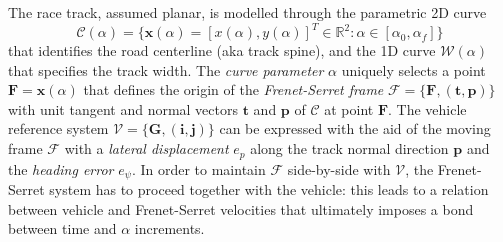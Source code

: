 \documentclass[conference]{IEEEtran} %
\renewcommand{\vec}[1]{\boldsymbol{#1}}
\DeclarePairedDelimiter{\norm}{\lVert}{\rVert}
\begin{document}
The race track, assumed planar, is modelled through the parametric 2D curve
\begin{equation}
\mathcal C(\alpha) = \{ \vec x (\alpha) = [x(\alpha), y(\alpha)]^T \in \mathbb{R}^2 : \alpha \in [\alpha_0, \alpha_f] \}
\end{equation}
%
that identifies the road centerline (aka track spine), and the 1D curve $\mathcal W(\alpha)$ that specifies the track width.
The \emph{curve parameter} $\alpha$ uniquely selects a point $\vec F = \vec x(\alpha)$ that defines the origin of the \emph{Frenet-Serret frame} $\mathcal F = \{ \vec F, (\vec t, \vec p) \}$ with unit tangent and normal vectors $\vec t$ and $\vec p$ of $\mathcal C$ at point $\vec F$.
%
The vehicle reference system $\mathcal V = \{ \vec G, (\vec i, \vec j) \}$ can be expressed with the aid of the moving frame $\mathcal F$ with a \emph{lateral displacement} $e_p$ along the track normal direction $\vec p$ and the \emph{heading error} $e_\psi$.
In order to maintain $\mathcal F$ side-by-side with $\mathcal V$, the Frenet-Serret system has to proceed together with the vehicle: this leads to a relation between vehicle and Frenet-Serret velocities that ultimately imposes a bond between time and $\alpha$ increments.

%
\end{document}
